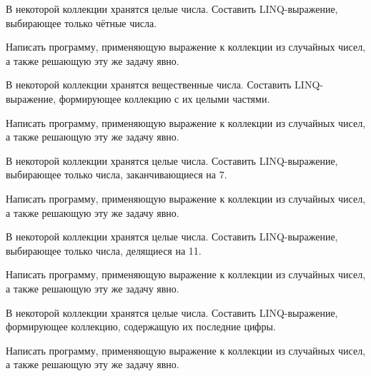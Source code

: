 \task В некоторой коллекции хранятся целые числа. Составить
LINQ-выражение, выбирающее только чётные числа.

Написать программу, применяющую выражение к коллекции из случайных
чисел, а также решающую эту же задачу явно.

\task В некоторой коллекции хранятся вещественные числа. Составить
LINQ-выражение, формирующее коллекцию с их целыми частями.

Написать программу, применяющую выражение к коллекции из случайных
чисел, а также решающую эту же задачу явно.

\task В некоторой коллекции хранятся целые числа. Составить
LINQ-выражение, выбирающее только числа, заканчивающиеся на 7.

Написать программу, применяющую выражение к коллекции из случайных
чисел, а также решающую эту же задачу явно.

\task В некоторой коллекции хранятся целые числа. Составить
LINQ-выражение, выбирающее только числа, делящиеся на 11.

Написать программу, применяющую выражение к коллекции из случайных
чисел, а также решающую эту же задачу явно.

\task В некоторой коллекции хранятся целые числа. Составить
LINQ-выражение, формирующее коллекцию, содержащую их последние цифры.

Написать программу, применяющую выражение к коллекции из случайных
чисел, а также решающую эту же задачу явно.
